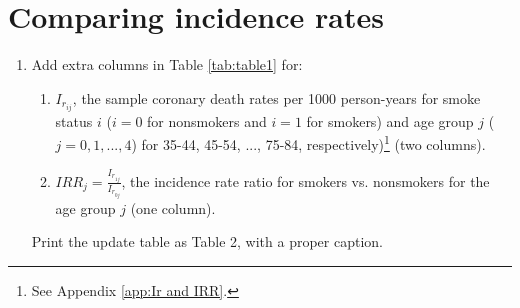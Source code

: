 \documentclass[10pt,a4paper,twoside]{article}\usepackage[]{graphicx}\usepackage[]{xcolor}
\begin{document}
\section{Comparing incidence rates}
\label{sec:Comparing_incidence_rates}
\begin{enumerate}
  \item Add extra columns in Table \ref{tab:table1} for:
  \begin{enumerate}
    \item $I_{r_{ij}}$, the sample coronary death rates per 1000 person-years for smoke status $i$ ($i = 0$ for nonsmokers and $i = 1$ for smokers) and age group $j$ ($j = 0, 1, ...,4$) for 35-44, 45-54, ..., 75-84, respectively)\footnote{\label{note1}See Appendix \ref{app:Ir and IRR}.} (two columns).

    \item $IRR_{j} = \frac{I_{r_{1j}}}{I_{r_{0j}}}$, the incidence rate ratio for smokers vs. nonsmokers for the age group $j$  (one column).

  \end{enumerate}
  Print the update table as Table 2, with a proper caption.
  

\end{enumerate}
\end{document}
